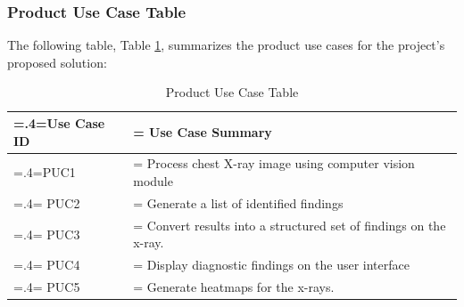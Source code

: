 \documentclass[12pt]{article}
\begin{document}
\subsubsection{Product Use Case Table}
The following table, Table \ref{table:productUseCase}, summarizes the product use cases for the project's proposed solution:
\begin{table}[H]
    \caption{Product Use Case Table}
    \label{table:productUseCase}
    \begin{tabularx}{\textwidth}{|>{\hsize=.4\hsize\linewidth=\hsize}X|>{\hsize=1.6\hsize\linewidth=\hsize}X|}
    \hline
    Use Case ID & Use Case Summary \\
    \hline
    PUC1 & Process chest X-ray image using computer vision module \\
    \hline
    PUC2 & Generate a list of identified findings \\
    \hline
    PUC3 & Convert results into a structured set of findings on the x-ray. \\
    \hline
    PUC4 & Display diagnostic findings on the user interface \\
    \hline
    PUC5 & Generate heatmaps for the x-rays. \\
    \hline
    \end{tabularx}
\end{table}
\end{document}
